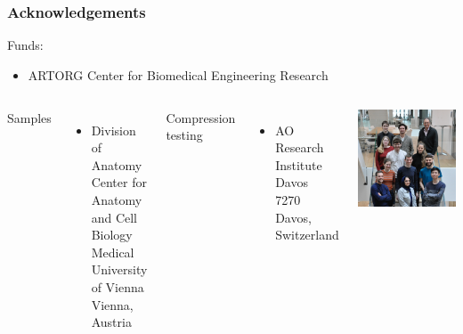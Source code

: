 \documentclass[xcolor=table,11pt]{beamer}
\begin{document}
	\section{}
	\begin{frame}
		\frametitle{Acknowledgements}
		Funds:
		\begin{itemize}
			\item ARTORG Center for Biomedical Engineering Research
		\end{itemize}
		\vspace{5mm}

		\begin{columns}
			Samples
			\begin{itemize}
				\item Division of Anatomy\\Center for Anatomy and Cell Biology\\Medical University of Vienna\\Vienna, Austria
			\end{itemize}
			\vspace{5mm}
			Compression testing
			\begin{itemize}
				\item AO Research Institute Davos\\7270 Davos, Switzerland
			\end{itemize}

			\centering
			\vfill
			\includegraphics[width=1.0\linewidth, trim=40 0 0 0]{Figures/GroupPhoto}

		\end{columns}

	\end{frame}
\end{document}
